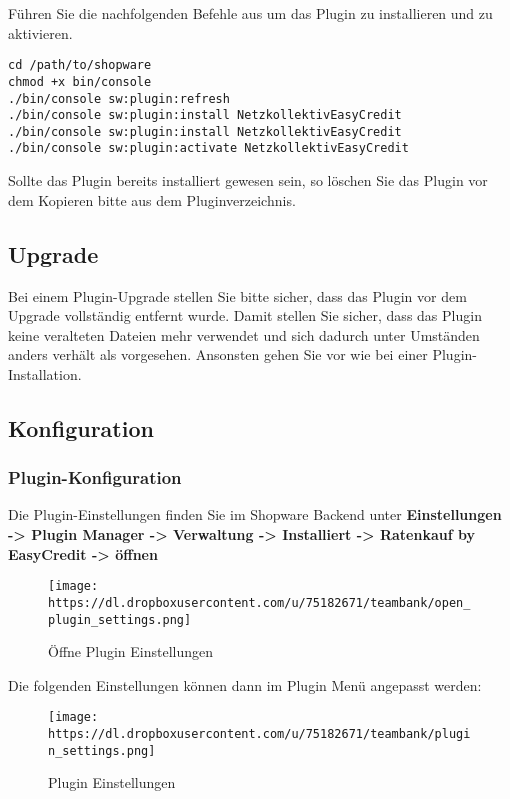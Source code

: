 Führen Sie die nachfolgenden Befehle aus um das Plugin zu installieren
und zu aktivieren.

\begin{verbatim}
cd /path/to/shopware
chmod +x bin/console
./bin/console sw:plugin:refresh
./bin/console sw:plugin:install NetzkollektivEasyCredit
./bin/console sw:plugin:install NetzkollektivEasyCredit
./bin/console sw:plugin:activate NetzkollektivEasyCredit
\end{verbatim}

Sollte das Plugin bereits installiert gewesen sein, so löschen Sie das
Plugin vor dem Kopieren bitte aus dem Pluginverzeichnis.

\subsection{Upgrade}\label{upgrade}

Bei einem Plugin-Upgrade stellen Sie bitte sicher, dass das Plugin vor
dem Upgrade vollständig entfernt wurde. Damit stellen Sie sicher, dass
das Plugin keine veralteten Dateien mehr verwendet und sich dadurch
unter Umständen anders verhält als vorgesehen. Ansonsten gehen Sie vor
wie bei einer Plugin-Installation.

\subsection{Konfiguration}\label{konfiguration}

\subsubsection{Plugin-Konfiguration}\label{plugin-konfiguration}

Die Plugin-Einstellungen finden Sie im Shopware Backend unter
\textbf{Einstellungen -\textgreater{} Plugin Manager -\textgreater{}
Verwaltung -\textgreater{} Installiert -\textgreater{} Ratenkauf by
EasyCredit -\textgreater{} öffnen}

\begin{figure}[htbp]
\centering
\texttt{[image: https://dl.dropboxusercontent.com/u/75182671/teambank/open\_plugin\_settings.png]}
\caption{Öffne Plugin Einstellungen}
\end{figure}

Die folgenden Einstellungen können dann im Plugin Menü angepasst werden:

\begin{figure}[htbp]
\centering
\texttt{[image: https://dl.dropboxusercontent.com/u/75182671/teambank/plugin\_settings.png]}
\caption{Plugin Einstellungen}
\end{figure}

